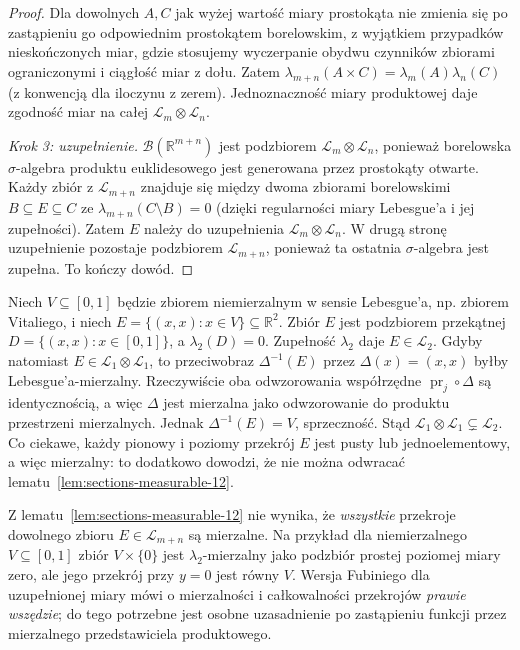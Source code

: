 \begin{proof}
Dla dowolnych $A,C$ jak wyżej wartość miary
prostokąta nie zmienia się po zastąpieniu go
odpowiednim prostokątem borelowskim, z wyjątkiem
przypadków nieskończonych miar, gdzie stosujemy
wyczerpanie obydwu czynników zbiorami ograniczonymi
i ciągłość miar z dołu. Zatem
$\lambda_{m+n}(A\times C)=\lambda_m(A)\lambda_n(C)$
(z konwencją dla iloczynu z zerem).
Jednoznaczność miary produktowej daje zgodność
miar na całej $\mathcal L_m\otimes\mathcal L_n$.

\emph{Krok 3: uzupełnienie.}
$\mathcal B(\mathbb R^{m+n})$ jest podzbiorem
$\mathcal L_m\otimes\mathcal L_n$, ponieważ
borelowska $\sigma$-algebra produktu euklidesowego
jest generowana przez prostokąty otwarte.
Każdy zbiór z $\mathcal L_{m+n}$ znajduje się
między dwoma zbiorami borelowskimi $B\subseteq E\subseteq C$
ze $\lambda_{m+n}(C\setminus B)=0$
(dzięki regularności miary Lebesgue'a i jej
zupełności). Zatem $E$ należy do uzupełnienia
$\mathcal L_m\otimes\mathcal L_n$.
W drugą stronę uzupełnienie pozostaje podzbiorem
$\mathcal L_{m+n}$, ponieważ ta ostatnia
$\sigma$-algebra jest zupełna. To kończy dowód.
\end{proof}

\begin{przyklad}
\label{ex:diagonal-not-product-12}
Niech $V\subseteq[0,1]$ będzie zbiorem niemierzalnym
w sensie Lebesgue'a, np. zbiorem Vitaliego, i niech
$E=\{(x,x):x\in V\}\subseteq\mathbb R^2$.
Zbiór $E$ jest podzbiorem przekątnej
$D=\{(x,x):x\in[0,1]\}$, a $\lambda_2(D)=0$.
Zupełność $\lambda_2$ daje $E\in\mathcal L_2$.
Gdyby natomiast $E\in\mathcal L_1\otimes\mathcal L_1$,
to przeciwobraz $\Delta^{-1}(E)$ przez
$\Delta(x)=(x,x)$ byłby Lebesgue'a-mierzalny.
Rzeczywiście oba odwzorowania współrzędne
$\operatorname{pr}_j\circ\Delta$ są identycznością,
a więc $\Delta$ jest mierzalna jako odwzorowanie
do produktu przestrzeni mierzalnych. Jednak
$\Delta^{-1}(E)=V$, sprzeczność. Stąd
$\mathcal L_1\otimes\mathcal L_1\subsetneq\mathcal L_2$.
Co ciekawe, każdy pionowy i poziomy przekrój $E$
jest pusty lub jednoelementowy, a więc mierzalny:
to dodatkowo dowodzi, że nie można odwracać
lematu~\ref{lem:sections-measurable-12}.
\end{przyklad}

\begin{uwaga}
Z lematu~\ref{lem:sections-measurable-12} nie wynika,
że \emph{wszystkie} przekroje dowolnego zbioru
$E\in\mathcal L_{m+n}$ są mierzalne. Na przykład
dla niemierzalnego $V\subseteq[0,1]$ zbiór
$V\times\{0\}$ jest $\lambda_2$-mierzalny jako
podzbiór prostej poziomej miary zero, ale jego
przekrój przy $y=0$ jest równy $V$.
Wersja Fubiniego dla uzupełnionej miary mówi o
mierzalności i całkowalności przekrojów
\emph{prawie wszędzie}; do tego potrzebne jest
osobne uzasadnienie po zastąpieniu funkcji
przez mierzalnego przedstawiciela produktowego.
\end{uwaga}


